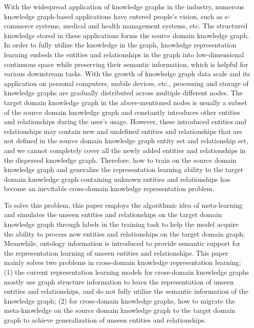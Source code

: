 With the widespread application of knowledge graphs in the industry, numerous knowledge graph-based applications have entered people's vision, such as e-commerce systems, medical and health management systems, etc. The structured knowledge stored in these applications forms the source domain knowledge graph. In order to fully utilize the knowledge in the graph, knowledge representation learning embeds the entities and relationships in the graph into low-dimensional continuous space while preserving their semantic information, which is helpful for various downstream tasks. With the growth of knowledge graph data scale and its application on personal computers, mobile devices, etc., processing and storage of knowledge graphs are gradually distributed across multiple different nodes. The target domain knowledge graph in the above-mentioned nodes is usually a subset of the source domain knowledge graph and constantly introduces other entities and relationships during the user's usage. However, these introduced entities and relationships may contain new and undefined entities and relationships that are not defined in the source domain knowledge graph entity set and relationship set, and we cannot completely cover all the newly added entities and relationships in the dispersed knowledge graph. Therefore, how to train on the source domain knowledge graph and generalize the representation learning ability to the target domain knowledge graph containing unknown entities and relationships has become an inevitable cross-domain knowledge representation problem.

To solve this problem, this paper employs the algorithmic idea of meta-learning and simulates the unseen entities and relationships on the target domain knowledge graph through labels in the training task to help the model acquire the ability to process new entities and relationships on the target domain graph. Meanwhile, ontology information is introduced to provide semantic support for the representation learning of unseen entities and relationships. This paper mainly solves two problems in cross-domain knowledge representation learning: (1) the current representation learning models for cross-domain knowledge graphs mostly use graph structure information to learn the representation of unseen entities and relationships, and do not fully utilize the semantic information of the knowledge graph; (2) for cross-domain knowledge graphs, how to migrate the meta-knowledge on the source domain knowledge graph to the target domain graph to achieve generalization of unseen entities and relationships.

